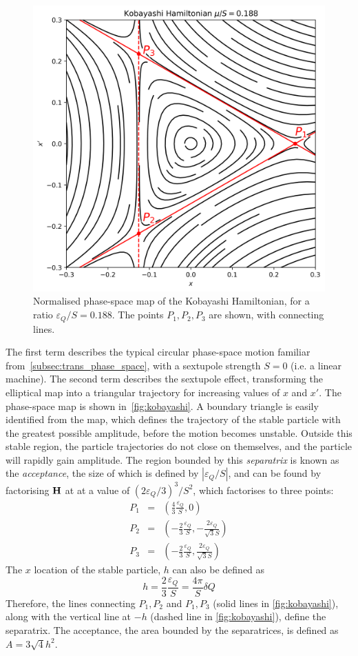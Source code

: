 \documentclass[a4paper,twoside,11pt]{report}
\begin{document}
\begin{figure}
  \centering
  \includegraphics[width=0.6\linewidth]{kobayashi.png}
  \caption[Phase-space map of the Kobayashi Hamiltonian]{Normalised phase-space map of the Kobayashi Hamiltonian, for a ratio ${\varepsilon_Q}/S=0.188$. The points $P_1, P_2, P_3$ are shown, with connecting lines.}\label{fig:kobayashi}
\end{figure}

The first term describes the typical circular phase-space motion familiar from~\autoref{subsec:trans_phase_space}, with a sextupole strength $S=0$ (i.e. a linear machine). The second term describes the sextupole effect, transforming the elliptical map into a triangular trajectory for increasing values of $x$ and $x'$. The phase-space map is shown in~\autoref{fig:kobayashi}. A boundary triangle is easily identified from the map, which defines the trajectory of the stable particle with the greatest possible amplitude, before the motion becomes unstable. Outside this stable region, the particle trajectories do not close on themselves, and the particle will rapidly gain amplitude. The region bounded by this \textit{separatrix} is known as the \textit{acceptance}, the size of which is defined by $|{\varepsilon_Q} /S|$, and can be found by factorising $\bf H$ at at a value of $(2{\varepsilon_Q} /3)^3/S^2$, which factorises to three points:
\begin{eqnarray}
  P_1 &=& \left(\frac 43 \frac{\varepsilon_Q} S,    0                       \right) \\
  P_2 &=& \left(-\frac 23 \frac {\varepsilon_Q} S,  -\frac{2{\varepsilon_Q}}{\sqrt 3 S} \right) \\
  P_3 &=& \left(-\frac 23 \frac {\varepsilon_Q} S,  \frac{2{\varepsilon_Q}}{\sqrt 3 S} \right)
\end{eqnarray}
The $x$ location of the stable particle, $h$ can also be defined as
\begin{equation}
  h=\frac 23 \frac {\varepsilon_Q} S = \frac{4\pi}S\delta Q
  \label{eq:apothem}
\end{equation}
Therefore, the lines connecting $P_1, P_2$ and $P_1, P_3$ (solid lines in \autoref{fig:kobayashi}), along with the vertical line at $-h$ (dashed line in \autoref{fig:kobayashi}), define the separatrix. The acceptance, the area bounded by the separatrices, is defined as $A=3\sqrt 4 h^2$.
\end{document}
